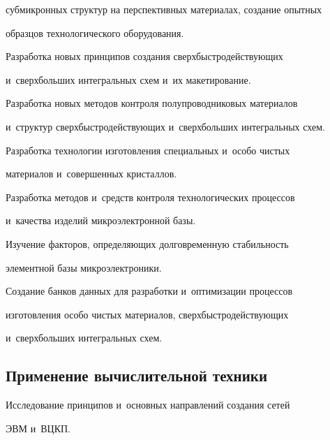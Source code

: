 суб\-мик\-рон\-ных структур на перспективных материалах, создание опытных 

образцов технологического оборудования.

     

     Разработка новых принципов создания сверх\-быст\-ро\-дей\-ст\-ву\-ющих 

и~сверхбольших интегральных схем и~их макетирование.

     

     Разработка новых методов контроля полупроводниковых материалов 

и~структур сверх\-быст\-ро\-дей\-ст\-ву\-ющих и~сверхбольших интегральных схем.

     

     Разработка технологии изготовления специальных и~особо чис\-тых 

материалов и~совершенных крис\-тал\-лов.

     

     Разработка методов и~средств контроля технологических процессов 

и~качества изделий мик\-ро\-элект\-рон\-ной базы.

     

     Изучение факторов, опре\-де\-ля\-ющих долговременную ста\-биль\-ность 

элементной базы мик\-ро\-элект\-ро\-ники.

     

     Создание банков данных для разработки и~оптимизации процессов 

из\-го\-тов\-ле\-ния особо чис\-тых материалов, сверх\-быст\-ро\-дей\-ст\-ву\-ющих 

и~сверхбольших интегральных схем.



\vspace*{-6pt}

     

     \subsection*{Применение вычислительной техники}

     

     \vspace*{-3pt}

     

     Исследование принципов и~основных на\-прав\-ле\-ний создания сетей 

ЭВМ и~\mbox{ВЦКП}.

